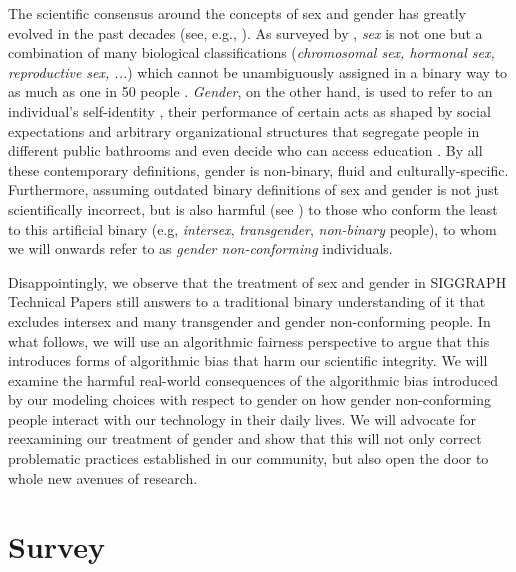 \documentclass[nonacm,sigconf,review,balance=false]{acmart}
\begin{document}



The scientific consensus around the concepts of sex and gender has greatly evolved in the past decades (see, e.g., \cite{pmid30377332}). As surveyed by \citet{fausto2012sex}, \emph{sex} is not one but a combination of many biological classifications (\emph{chromosomal sex, hormonal sex, reproductive sex, ...}) which cannot be unambiguously assigned in a binary way to as much as one in 50 people \cite{blackless2000sexually}.
\emph{Gender}, on the other hand, is used to refer to an individual's self-identity \cite{money1972man}, their performance of certain acts as shaped by social expectations \cite{butler2003gender} and arbitrary organizational structures that segregate people in different public bathrooms and even decide who can access  education \cite{lorber1994paradoxes}. By all these contemporary definitions, gender is non-binary, fluid and culturally-specific. Furthermore, assuming outdated binary definitions of sex and gender is not just scientifically incorrect, but is also harmful (see \cite{un2015report}) to those who conform the least to this artificial binary (e.g, \emph{intersex}, \emph{transgender}, \emph{non-binary} people), to whom we will onwards refer to as \emph{gender non-conforming} individuals.

Disappointingly, we observe that the treatment of sex and gender in SIGGRAPH Technical Papers
still answers to a traditional binary understanding of it that excludes intersex and many transgender and
gender non-conforming people. In what follows, we will use an algorithmic fairness perspective to argue that this introduces forms of algorithmic bias that harm our scientific integrity.
We will examine the harmful real-world consequences of the algorithmic bias introduced by our modeling
choices with respect to gender on how gender non-conforming people interact with
our technology in their daily lives. We will advocate for reexamining our
treatment of gender and show that this will not only correct problematic practices established in
our community, but also open the door to whole new avenues of research.

\vspace{-0.1cm}
\section{Survey}
\end{document}
